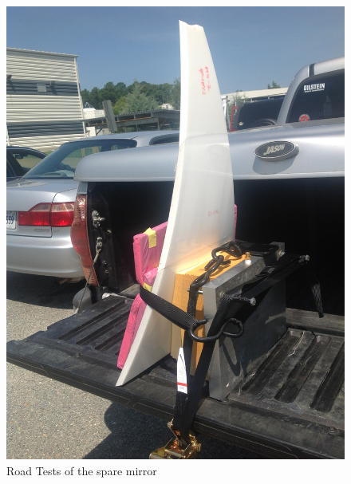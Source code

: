 \begin{figure}[htbp]
    \centering
    \includegraphics[trim={1.5cm 5cm 0 2cm }, clip, width=\linewidth]{Road_Test.JPG}
    \caption{Road Tests of the spare mirror}
    \label{fig:transportation_spare_mirror}
\end{figure}

